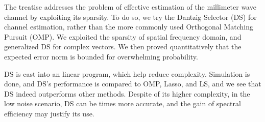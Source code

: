 
\startchapter [title={Conclusion}]

The treatise addresses the problem of effective estimation of the millimeter wave channel by exploiting its sparsity.
To do so, we try the Dantzig Selector (DS) for channel estimation, rather than the more commonly used Orthogonal Matching Pursuit (OMP).
We exploited the sparsity of spatial frequency domain, and generalized DS for complex vectors.
We then proved quantitatively that the expected error norm is bounded for overwhelming probability.

DS is cast into an linear program, which help reduce complexity.
Simulation is done, and DS's performance is compared to OMP, Lasso, and LS, and we see that DS indeed outperforms other methods.
Despite of its higher complexity, in the low noise scenario, DS can be  times more accurate, and the gain of spectral efficiency may justify its use.

\stopchapter


